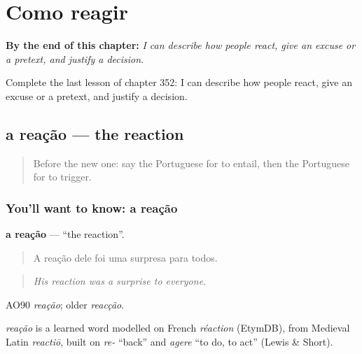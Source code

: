
\chapter{Como reagir}
\label{ch:pt-como-reagir}

\begin{chapteropening}
\textbf{By the end of this chapter:} \emph{I can describe how people react, give an excuse or a pretext, and justify a decision.}

Complete the last lesson of chapter 352: I can describe how people react, give an excuse or a pretext, and justify a decision.
\end{chapteropening}

\section[a reação]{a reação — the reaction}

\label{lesson:PT-C352-reacao}



\begin{quote}
Before the new one: say the Portuguese for to entail, then the Portuguese for to trigger.
\end{quote}

\subsection*{You'll want to know: a reação}
\textbf{a reação} — \textquotedblleft{}the reaction\textquotedblright{}.

\begin{quote}
A reação dele foi uma surpresa para todos.
\end{quote}

\begin{quote}
\emph{His reaction was a surprise to everyone.}
\end{quote}

AO90 \emph{reação}; older \emph{reacção}.

\begin{cousinweb}
\emph{reação} is a learned word modelled on French \emph{réaction} (EtymDB), from Medieval Latin \emph{reactiō}, built on \emph{re-} \textquotedblleft{}back\textquotedblright{} and \emph{agere} \textquotedblleft{}to do, to act\textquotedblright{} (Lewis \& Short).
\end{cousinweb}

